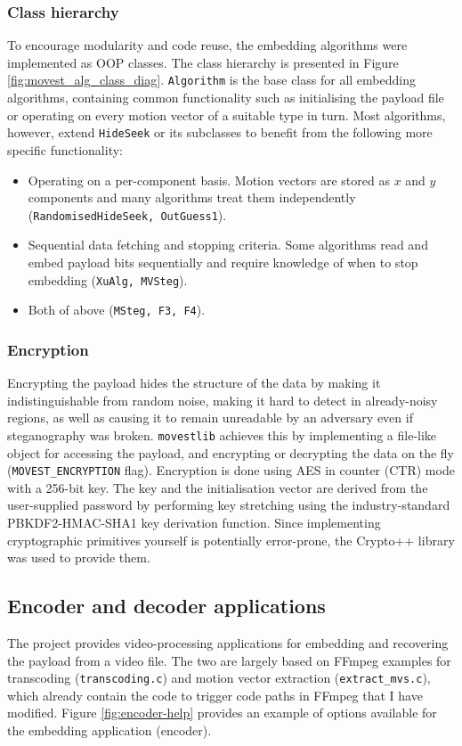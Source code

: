 \documentclass[12pt,british,twoside,notitlepage,usenames,dvipsnames,hypens,final]{report}
\numberwithin{equation}{section}
\numberwithin{figure}{section}
\begin{document}
\subsubsection{Class hierarchy}

To encourage modularity and code reuse, the embedding algorithms were implemented as OOP classes. The class hierarchy is presented in Figure \ref{fig:movest_alg_class_diag}. \texttt{Algorithm} is the base class for all embedding algorithms, containing common functionality such as initialising the payload file or operating on every motion vector of a suitable type in turn. Most algorithms, however, extend \texttt{HideSeek} or its subclasses to benefit from the following more specific functionality:

\begin{itemize}
\item Operating on a per-component basis. Motion vectors are stored as $x$ and $y$ components and many algorithms treat them independently (\texttt{RandomisedHideSeek, OutGuess1}).
\item Sequential data fetching and stopping criteria. Some algorithms read and embed payload bits sequentially and require knowledge of when to stop embedding (\texttt{XuAlg, MVSteg}).
\item Both of above (\texttt{MSteg, F3, F4}).
\end{itemize}

\subsubsection{Encryption}
\label{encryption}
Encrypting the payload hides the structure of the data by making it indistinguishable from random noise, making it hard to detect in already-noisy regions, as well as causing it to remain unreadable by an adversary even if steganography was broken. \texttt{movestlib} achieves this by implementing a file-like object for accessing the payload, and encrypting or decrypting the data on the fly (\texttt{MOVEST\_ENCRYPTION} flag). Encryption is done using AES in counter (CTR) mode with a 256-bit key. The key and the initialisation vector are derived from the user-supplied password by performing key stretching using the industry-standard PBKDF2-HMAC-SHA1 key derivation function. Since implementing cryptographic primitives yourself is potentially error-prone, the Crypto++ library was used to provide them. 

\subsection{Encoder and decoder applications}
\label{enc-dec-bin}
The project provides video-processing applications for embedding and recovering the payload from a video file. The two are largely based on FFmpeg examples for transcoding (\texttt{transcoding.c}) and motion vector extraction (\texttt{extract\_mvs.c}), which already contain the code to trigger code paths in FFmpeg that I have modified. Figure \ref{fig:encoder-help} provides an example of options available for the embedding application (encoder).
\end{document}
